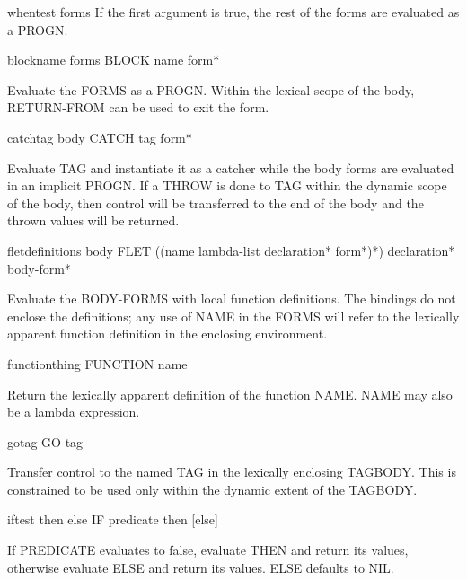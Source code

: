 \documentclass[10pt,english]{book}
\begin{document}
\begin{macro}{when}{test \body forms}
  If the first argument is true, the rest of the forms are
evaluated as a PROGN.
\end{macro}

\begin{specialop}{block}{name \rest forms}
  BLOCK name form*

Evaluate the FORMS as a PROGN. Within the lexical scope of the body,
RETURN-FROM can be used to exit the form.
\end{specialop}

\begin{specialop}{catch}{tag \body body}
  CATCH tag form*

Evaluate TAG and instantiate it as a catcher while the body forms are
evaluated in an implicit PROGN. If a THROW is done to TAG within the dynamic
scope of the body, then control will be transferred to the end of the body and
the thrown values will be returned.
\end{specialop}

\begin{specialop}{flet}{definitions \body body}
  FLET ({(name lambda-list declaration* form*)}*) declaration* body-form*

Evaluate the BODY-FORMS with local function definitions. The bindings do
not enclose the definitions; any use of NAME in the FORMS will refer to the
lexically apparent function definition in the enclosing environment.
\end{specialop}

\begin{specialop}{function}{thing}
  FUNCTION name

Return the lexically apparent definition of the function NAME. NAME may also
be a lambda expression.
\end{specialop}

\begin{specialop}{go}{tag}
  GO tag

Transfer control to the named TAG in the lexically enclosing TAGBODY. This is
constrained to be used only within the dynamic extent of the TAGBODY.
\end{specialop}

\begin{specialop}{if}{test then \op else}
  IF predicate then [else]

If PREDICATE evaluates to false, evaluate THEN and return its values,
otherwise evaluate ELSE and return its values. ELSE defaults to NIL.
\end{specialop}
\end{document}
